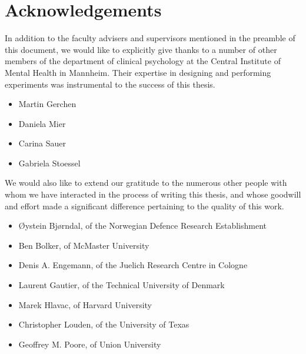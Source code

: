 \chapter{Acknowledgements}
    In addition to the faculty advisers and supervisors mentioned in the preamble of this document, we would like to explicitly give thanks to a number of other members of the department of clinical psychology at the Central Institute of Mental Health in Mannheim.
    Their expertise in designing and performing experiments was instrumental to the success of this thesis.
    \begin{multicols}{2}
	\begin{itemize}
	    \item Martin Gerchen
	    \item Daniela Mier
	    \item Carina Sauer
	    \item Gabriela Stoessel
	\end{itemize}
    \end{multicols}
    \vspace{0.5cm}
    We would also like to extend our gratitude to the numerous other people with whom we have interacted in the process of writing this thesis, and whose goodwill and effort made a significant difference pertaining to the quality of this work.
    \begin{itemize}
	\item Øystein Bjørndal, of the Norwegian Defence Research Establishment
	\item Ben Bolker, of McMaster University
        \item Denis A. Engemann, of the Juelich Research Centre in Cologne
	\item Laurent Gautier, of the Technical University of Denmark
	\item Marek Hlavac, of Harvard University
	\item Christopher Louden, of the University of Texas
	\item Geoffrey M. Poore, of Union University
    \end{itemize}

